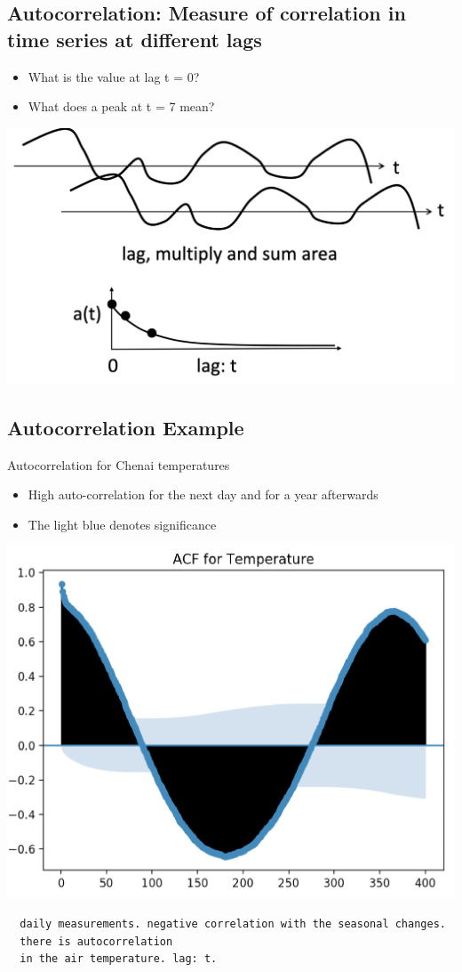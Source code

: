 \documentclass[11pt]{article}
\theoremstyle{definition}
\begin{document}
\subsection{Autocorrelation:
Measure of correlation in time series
at different lags}

\begin{itemize}
  \item What is the value at lag t = 0?
  \item What does a peak at t = 7 mean?
\end{itemize}

\includegraphics[width=\textwidth/2]{8.png}

\subsection{Autocorrelation Example}
Autocorrelation for
Chenai temperatures

\begin{itemize}
  \item High auto-correlation
  for the next day and
  for a year afterwards
  \item The light blue
  denotes significance
\end{itemize}

\includegraphics[width=\textwidth/2]{9.png}
\begin{verbatim}
  daily measurements. negative correlation with the seasonal changes. 
  there is autocorrelation
  in the air temperature. lag: t.
\end{verbatim}
\end{document}
